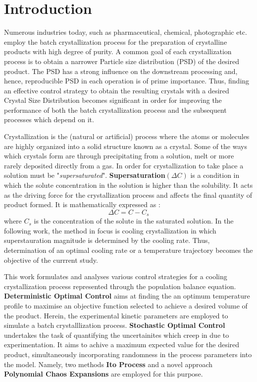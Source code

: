 \documentclass[3p,times]{elsarticle}
\begin{document}
\section{Introduction}
\label{intro}
Numerous industries today, such as pharmaceutical, chemical, photographic etc. employ the batch crystallization process for the preparation of crystalline products with high degree of purity. A common goal of each crystallization process is to obtain a narrower Particle size distribution (PSD) of the desired product. The PSD has a strong influence on the downstream processing and, hence, reproducible PSD in each operation is of prime importance. Thus, finding an effective control strategy to obtain the resulting crystals with a desired Crystal Size Distribution becomes significant in order for improving the performance of both the batch crystallization process and the subsequent processes which depend on it. \par
Crystallization is the (natural or artificial) process where the atoms or molecules are highly organized into a solid structure known as a crystal. Some of the ways which crystals form are through precipitating 
from a solution, melt or more rarely deposited directly from a gas. In order for crystallization to take place a solution must be "\textit{supersaturated}". \textbf{Supersaturation}$(\Delta{C})$  is a condition in which the solute concentration in the solution is
higher than the solubility. It acts as the driving force for the crystallization process and affects the final quantity of product formed. It is mathematically expressed  as : 
\begin{equation}
\Delta{C} = C - C_{s}
\end{equation}
where $C_{s}$ is the concentration of the solute in the saturated solution.
In the following work, the method in focus is cooling crystallization in which superstauration magnitude is determined by the cooling rate. Thus, determination of an optimal cooling rate or a temperature trajectory becomes the objective of the currrent study. \par 
This work formulates and analyses various control strategies for a cooling crystallization process represented through the population balance equation. \textbf{Deterministic Optimal Control} aims at finding the an optimum temperature profile to maximise an objective function selected to achieve a desired volume of the product.
Herein, the experimental kinetic parameters are employed to simulate a batch crystalllization process. \textbf{Stochastic Optimal Control} undertakes the task of quantifying the uncertainites which creep in due to experimentation. It aims to achive a maximum expected value for the desired product, simultaneously incorporating randomness in the process parameters into the model. Namely, two methods \textbf{Ito Process} and a novel approach \textbf{Polynomial Chaos Expansions} are employed for this purpose. \par
\end{document}
